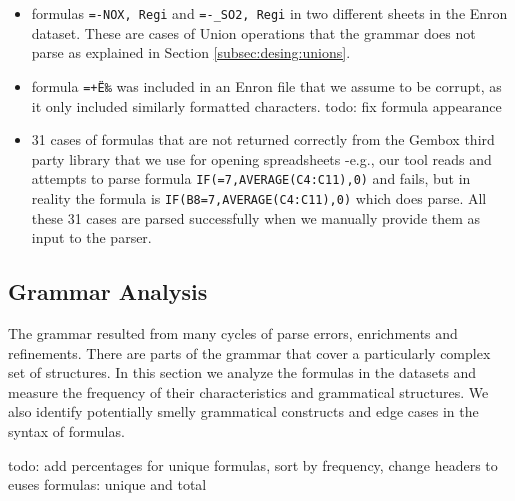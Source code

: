 \documentclass[conference]{IEEEtran}
\begin{document}
\begin{itemize}
	\item formulas \texttt{=-NOX, Regi} and \texttt{=-_SO2, Regi} in two different sheets in the Enron dataset. These are cases of Union operations that the grammar does not parse as explained in Section \ref{subsec:desing:unions}.
	\item formula \texttt{=+Ë‰} was included in an Enron file that we assume to be corrupt, as it only included similarly formatted characters. todo: fix formula appearance
	\item 31 cases of formulas that are not returned correctly from the Gembox third party library that we use for opening spreadsheets -e.g., our tool reads and attempts to parse formula \texttt{IF(=7,AVERAGE(C4:C11),0)} and fails, but in reality the formula is \texttt{IF(B8=7,AVERAGE(C4:C11),0)} which does parse. All these 31 cases are parsed successfully when we manually provide them as input to the parser.
\end{itemize}

\subsection{Grammar Analysis}
The grammar resulted from many cycles of parse errors, enrichments and refinements. There are parts of the grammar that cover a particularly complex set of structures. In this section we analyze the formulas in the datasets and measure the frequency of their characteristics and grammatical structures. We also identify potentially smelly grammatical constructs and edge cases in the syntax of formulas.

todo: add percentages for unique formulas, sort by frequency, change headers to euses formulas: unique and total
\end{document}

